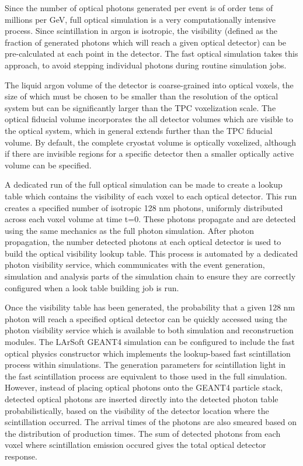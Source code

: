 \documentclass[12pt]{elsarticle}
\begin{document}
Since the number of optical photons generated per event is of order tens of millions per GeV, full optical simulation is a very computationally intensive process.  Since scintillation in argon is isotropic, the visibility (defined as the fraction of generated photons which will reach a given optical detector) can be pre-calculated at each point in the detector.  The fast optical simulation takes this approach, to avoid stepping individual photons during routine simulation jobs.

The liquid argon volume of the detector is coarse-grained into optical voxels, the size of which must be chosen to be smaller than the resolution of the optical system but can be significantly larger than the TPC voxelization scale.  The optical fiducial volume incorporates the all detector volumes which are visible to the optical system, which in general extends further than the TPC fiducial volume.  By default, the complete cryostat volume is optically voxelized, although if there are invisible regions for a specific detector then a smaller optically active volume can be specified.

A dedicated run of the full optical simulation can be made to create a lookup table which contains the visibility of each voxel to each optical detector.  This run creates a specified number of isotropic 128 nm photons, uniformly distributed across each voxel volume at time t=0.  These photons propagate and are detected using the same mechanics as the full photon simulation.  After photon propagation, the number detected photons at each optical detector is used to build the optical visibility lookup table.  This process is automated by a dedicated photon visibility service, which communicates with the event generation, simulation and analysis parts of the simulation chain to ensure they are correctly configured when a look table building job is run.

Once the visibility table has been generated, the probability that a given 128 nm photon will reach a specified optical detector can be quickly accessed using the photon visibility service which is available to both simulation and reconstruction modules.  The LArSoft GEANT4 simulation can be configured to include the fast optical physics constructor which implements the lookup-based fast scintillation process within simulations. The generation parameters for scintillation light in the fast scintillation process are equivalent to those used in the full simulation.  However, instead of placing optical photons onto the GEANT4 particle stack, detected optical photons are inserted directly into the detected photon table probabilistically, based on the visibility of the detector location where the scintillation occurred.  The arrival times of the photons are also smeared based on the distribution of production times.  The sum of detected photons from each voxel where scintillation emission occured gives the total optical detector response.
\end{document}
